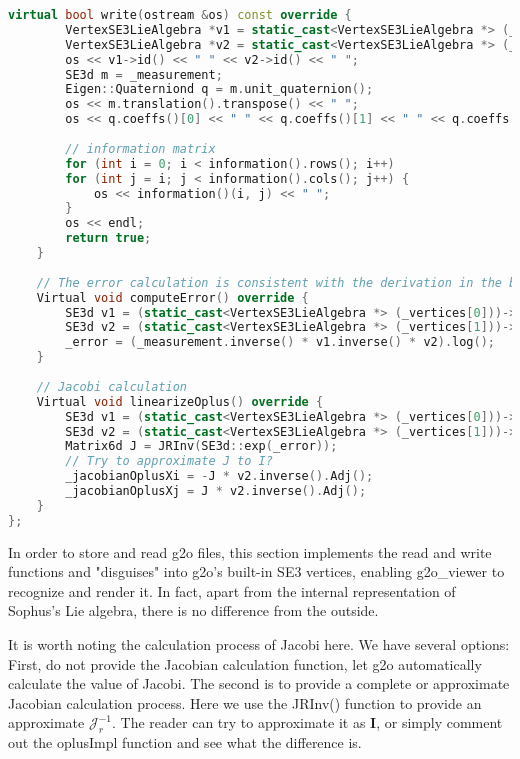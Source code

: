 \begin{lstlisting}[language=c++,caption=slambook2/ch10/pose\_graph\_g2o\_lie\_algebra.cpp（片段）]
    virtual bool write(ostream &os) const override {
        VertexSE3LieAlgebra *v1 = static_cast<VertexSE3LieAlgebra *> (_vertices[0]);
        VertexSE3LieAlgebra *v2 = static_cast<VertexSE3LieAlgebra *> (_vertices[1]);
        os << v1->id() << " " << v2->id() << " ";
        SE3d m = _measurement;
        Eigen::Quaterniond q = m.unit_quaternion();
        os << m.translation().transpose() << " ";
        os << q.coeffs()[0] << " " << q.coeffs()[1] << " " << q.coeffs()[2] << " " << q.coeffs()[3] << " ";
        
        // information matrix 
        for (int i = 0; i < information().rows(); i++)
        for (int j = i; j < information().cols(); j++) {
            os << information()(i, j) << " ";
        }
        os << endl;
        return true;
    }
    
    // The error calculation is consistent with the derivation in the book
    Virtual void computeError() override {
        SE3d v1 = (static_cast<VertexSE3LieAlgebra *> (_vertices[0]))->estimate();
        SE3d v2 = (static_cast<VertexSE3LieAlgebra *> (_vertices[1]))->estimate();
        _error = (_measurement.inverse() * v1.inverse() * v2).log();
    }
    
    // Jacobi calculation
    Virtual void linearizeOplus() override {
        SE3d v1 = (static_cast<VertexSE3LieAlgebra *> (_vertices[0]))->estimate();
        SE3d v2 = (static_cast<VertexSE3LieAlgebra *> (_vertices[1]))->estimate();
        Matrix6d J = JRInv(SE3d::exp(_error));
        // Try to approximate J to I?
        _jacobianOplusXi = -J * v2.inverse().Adj();
        _jacobianOplusXj = J * v2.inverse().Adj();
    }
};
\end{lstlisting}


In order to store and read g2o files, this section implements the read and write functions and "disguises" into g2o's built-in SE3 vertices, enabling g2o\_viewer to recognize and render it. In fact, apart from the internal representation of Sophus's Lie algebra, there is no difference from the outside.

It is worth noting the calculation process of Jacobi here. We have several options: First, do not provide the Jacobian calculation function, let g2o automatically calculate the value of Jacobi. The second is to provide a complete or approximate Jacobian calculation process. Here we use the JRInv() function to provide an approximate $\bm{\mathcal{J}}_r^{-1}$. The reader can try to approximate it as $\bm{I}$, or simply comment out the oplusImpl function and see what the difference is.

